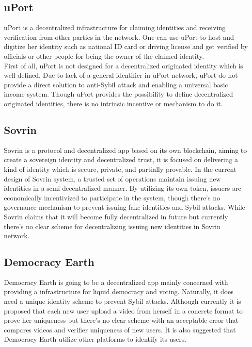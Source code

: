 \documentclass[conference]{IEEEtran}
\begin{document}
\subsection{uPort}

uPort is a decentralized infrastructure for claiming identities and receiving verification from other parties in the network. One can use uPort to host and digitize her identity such as national ID card or driving license and get verified by officials or other people for being the owner of the claimed identity.\\
 First of all, uPort is not designed for a decentralized originated identity which is well defined. Due to lack of a general identifier in uPort network, uPort do not provide a direct solution to anti-Sybil attack and enabling a universal basic income system. Though uPort provides the possibility to define decentralized originated identities, there is no intrinsic incentive or mechanism to do it.

\subsection{Sovrin}

Sovrin is a protocol and decentralized app based on its own blockchain, aiming to create a sovereign identity and decentralized trust, it is focused on delivering a kind of identity which is secure, private, and partially provable. In the current design of Sovrin system, a trusted set of operations maintain issuing new identities in a semi-decentralized manner. By utilizing its own token, issuers are economically incentivized to participate in the system, though there’s no governance mechanism to prevent issuing fake identities and Sybil attacks. While Sovrin claims that it will become fully decentralized in future but currently there’s no clear scheme for decentralizing issuing new identities in Sovrin network. 

\subsection{Democracy Earth}
Democracy Earth is going to be a decentralized app mainly concerned with providing a infrastructure for liquid democracy and voting. Naturally, it does need a unique identity scheme to prevent Sybil attacks. Although currently it is proposed that each new user upload a video from herself in a concrete format to prove her uniqueness but there’s no clear scheme with an acceptable error that compares videos and verifier uniqueness of new users. It is also suggested that Democracy Earth utilize other platforms to identify its users.
\end{document}
